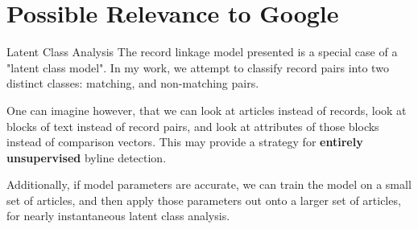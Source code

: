 \documentclass{beamer}
\begin{document}
\section{Possible Relevance to Google}
\begin{frame}{Latent Class Analysis}
	The record linkage model presented is a special case of a "latent class model". In my work, we attempt to classify record pairs into two distinct classes: matching, and non-matching pairs.
	\linebreak 
	
	One can imagine however, that we can look at articles instead of records, look at blocks of text instead of record pairs, and look at attributes of those blocks instead of comparison vectors. This may provide a strategy for \textbf{entirely unsupervised} byline detection.
	\linebreak
	
	Additionally, if model parameters are accurate, we can train the model on a small set of articles, and then apply those parameters out onto a larger set of articles, for nearly instantaneous latent class analysis. 
\end{frame}
\end{document}
